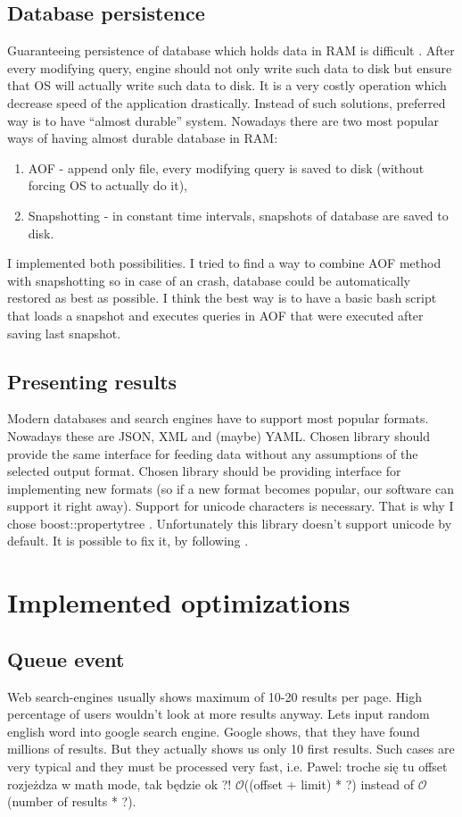\documentclass[10pt,a4paper]{article}
\newcommand{\pawel}[1]{\noindent\colorbox{myRed}{Pawel: #1}}
\newcommand{\Oh}{\mathcal{O}}
\begin{document}
\subsection{Database persistence}
Guaranteeing persistence of database which holds data in RAM is difficult \cite{REDPE} . After every modifying query, engine should not only write such data to disk but ensure that OS will actually write such data to disk. It is a very costly operation which decrease speed of the application drastically. Instead of such solutions, preferred way is to have “almost durable” system.
Nowadays there are two most popular ways of having almost durable database in RAM:

\begin{enumerate}
\item AOF - append only file, every modifying query is saved to disk (without forcing OS to actually do it),
\item Snapshotting - in constant time intervals, snapshots of database are saved to disk.
\end{enumerate}
I implemented both possibilities. I tried to find a way to combine AOF method with snapshotting so in case of an crash, database could be automatically restored as best as possible. I think the best way is to have a basic bash script that loads a snapshot and executes queries in AOF that were executed after saving last snapshot.

\subsection{Presenting results}
Modern databases and search engines have to support most popular formats. Nowadays these are
JSON, XML and (maybe) YAML. Chosen library should provide the same interface for feeding data without any assumptions of the selected output format. Chosen library should be providing interface for implementing new formats (so if a new format becomes popular, our software can support it right away). Support for unicode characters is necessary. That is why I chose boost::property\textunderscore tree . 
Unfortunately this library doesn't support unicode by default. It is possible to fix it, by following \cite{SOANS} .

\section{Implemented optimizations}
\subsection{Queue event}
Web search-engines usually shows maximum of 10-20 results per page. High percentage of users wouldn't look at more results anyway. Lets input random english word into google search engine. Google shows, that they have found millions of results. But they actually shows us only 10 first results. Such cases are very typical and they must be processed very fast, i.e. \pawel{troche się tu offset rozjeżdza w math mode, tak będzie ok ?!} $\Oh$((offset + limit) * ?) instead of $\Oh$(number of results * ?).
\end{document}
